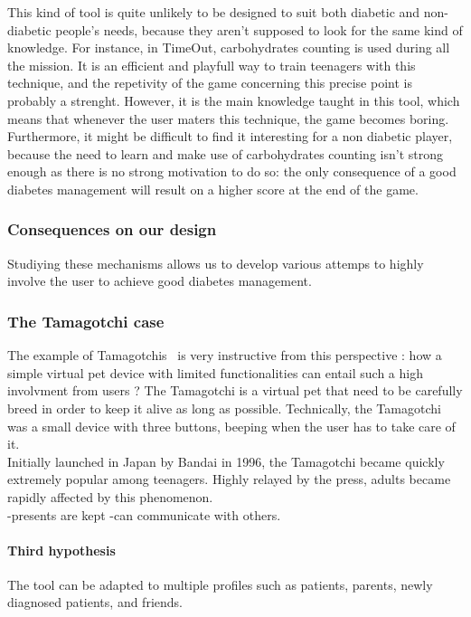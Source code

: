 \documentclass[12pt,MSc]{muthesis}
\begin{document}
This kind of tool is quite unlikely to be designed to suit both diabetic and non-diabetic people's needs, because they aren't supposed to look for the same kind of knowledge. For instance, in TimeOut, carbohydrates counting is used during all the mission. It is an efficient and playfull way to train teenagers with this technique, and the repetivity of the game concerning this precise point is probably a strenght. However, it is the main knowledge taught in this tool, which means that whenever the user maters this technique, the game becomes boring. Furthermore, it might be difficult to find it interesting for a non diabetic player, because the need to learn and make use of carbohydrates counting isn't strong enough as there is no strong motivation to do so: the only consequence of a good diabetes management will result on a higher score at the end of the game.\\

\subsubsection{Consequences on our design}
Studiying these mechanisms allows us to develop various attemps to highly involve the user to achieve good diabetes management. 

\subsubsection{The Tamagotchi case}
The example of Tamagotchis~\cite{holzinger2001triangle} is very instructive from this perspective : how a simple virtual pet device with limited functionalities can entail such a high involvment from users ? The Tamagotchi is a virtual pet that need to be carefully breed in order to keep it alive as long as possible. Technically, the Tamagotchi was a small device with three buttons, beeping when the user has to take care of it. \\
Initially launched in Japan by Bandai in 1996, the Tamagotchi became quickly extremely popular among teenagers. Highly relayed by the press, adults became rapidly affected by this phenomenon.\\

-presents are kept
-can communicate with others.
\fi 

\paragraph{Third hypothesis}%
The tool can be adapted to multiple profiles such as patients, parents, newly diagnosed patients, and friends. 
\end{document}
